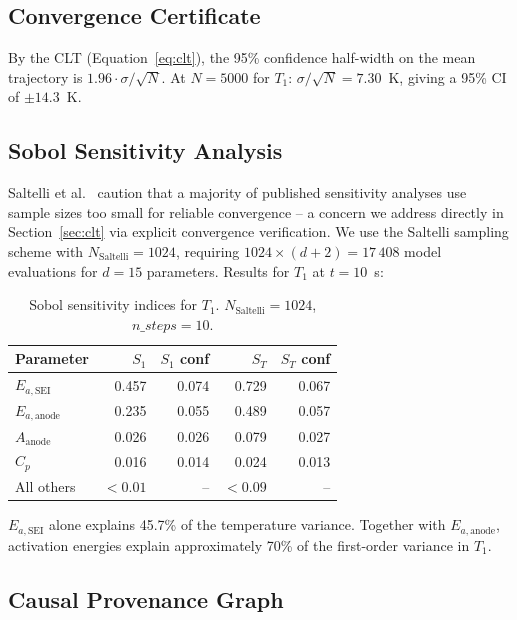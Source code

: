 \documentclass[12pt,a4paper]{article}
\theoremstyle{plain}
\theoremstyle{definition}
\theoremstyle{remark}
\begin{document}
\subsection{Convergence Certificate}

By the CLT (Equation~\ref{eq:clt}), the 95\% confidence half-width
on the mean trajectory is $1.96 \cdot \sigma/\sqrt{N}$.
At $N=5000$ for $T_1$: $\sigma/\sqrt{N} = 7.30$~K,
giving a 95\% CI of $\pm 14.3$~K.

\subsection{Sobol Sensitivity Analysis}

Saltelli et al.~\citep{saltelli2019} caution that a majority of published sensitivity analyses use sample sizes too small for reliable convergence -- a concern we address directly in Section~\ref{sec:clt} via explicit convergence verification. We use the Saltelli sampling scheme with $N_\text{Saltelli}=1024$,
requiring $1024 \times (d+2) = 17\,408$ model evaluations for $d=15$
parameters.
Results for $T_1$ at $t=10$~s:

\begin{table}[h]
\centering
\caption{Sobol sensitivity indices for $T_1$.
  $N_\text{Saltelli}=1024$, $n\_steps=10$.}
\label{tab:sobol}
\begin{tabular}{lrrrr}
\toprule
\textbf{Parameter} & $S_1$ & $S_1$ conf & $S_T$ & $S_T$ conf \\
\midrule
$E_{a,\text{SEI}}$ & 0.457 & 0.074 & 0.729 & 0.067 \\
$E_{a,\text{anode}}$ & 0.235 & 0.055 & 0.489 & 0.057 \\
$A_\text{anode}$ & 0.026 & 0.026 & 0.079 & 0.027 \\
$C_p$ & 0.016 & 0.014 & 0.024 & 0.013 \\
All others & $<0.01$ & -- & $<0.09$ & -- \\
\bottomrule
\end{tabular}
\end{table}

$E_{a,\text{SEI}}$ alone explains 45.7\% of the temperature variance.
Together with $E_{a,\text{anode}}$, activation energies explain
approximately 70\% of the first-order variance in $T_1$.

\subsection{Causal Provenance Graph}
\end{document}
